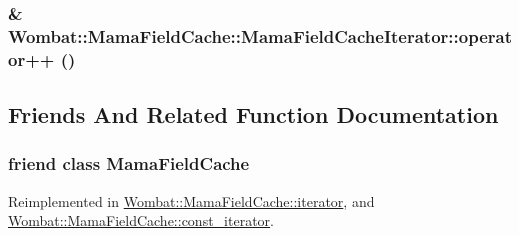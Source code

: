 \hypertarget{classWombat_1_1MamaFieldCache_1_1MamaFieldCacheIterator_a7fac373506188f9524bbc69d9e6d06fd}{
\subsubsection[{operator++}]{\& Wombat::MamaFieldCache::MamaFieldCacheIterator::operator++ ()}}
\label{classWombat_1_1MamaFieldCache_1_1MamaFieldCacheIterator_a7fac373506188f9524bbc69d9e6d06fd}


\subsection{Friends And Related Function Documentation}
\hypertarget{classWombat_1_1MamaFieldCache_1_1MamaFieldCacheIterator_a6a1b5aceea64638fc294b40bdb9251fb}{
\subsubsection[{MamaFieldCache}]{\setlength{\rightskip}{0pt plus 5cm}friend class {\bf MamaFieldCache}}}
\label{classWombat_1_1MamaFieldCache_1_1MamaFieldCacheIterator_a6a1b5aceea64638fc294b40bdb9251fb}


Reimplemented in \hyperlink{classWombat_1_1MamaFieldCache_1_1iterator_a6a1b5aceea64638fc294b40bdb9251fb}{Wombat::MamaFieldCache::iterator}, and \hyperlink{classWombat_1_1MamaFieldCache_1_1const__iterator_a6a1b5aceea64638fc294b40bdb9251fb}{Wombat::MamaFieldCache::const\_\-iterator}.

